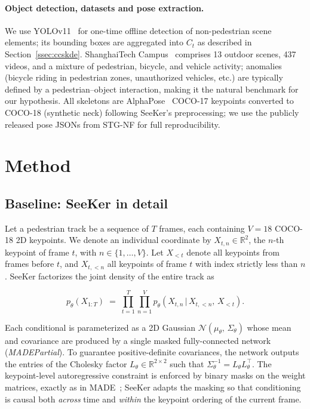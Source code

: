 \documentclass{article}
\begin{document}
\paragraph{Object detection, datasets and pose extraction.}
We use YOLOv11~\citep{ultralytics2024yolov11} for one-time offline detection
of non-pedestrian scene elements; its bounding boxes are aggregated into
$C_t$ as described in Section~\ref{ssec:ccskde}. ShanghaiTech
Campus~\citep{liu2018future} comprises 13 outdoor scenes, 437 videos, and a
mixture of pedestrian, bicycle, and vehicle activity; anomalies (bicycle
riding in pedestrian zones, unauthorized vehicles, etc.) are typically
defined by a pedestrian--object interaction, making it the natural benchmark
for our hypothesis. All skeletons are AlphaPose~\citep{fang2017rmpe}
COCO-17 keypoints converted to COCO-18 (synthetic neck) following SeeKer's
preprocessing; we use the publicly released pose JSONs from STG-NF for full
reproducibility.

\section{Method}
\label{sec:method}

\subsection{Baseline: SeeKer in detail}
\label{ssec:baseline}

Let a pedestrian track be a sequence of $T$ frames, each containing $V=18$
COCO-18 2D keypoints. We denote an individual coordinate by
$X_{t,n} \in \mathbb{R}^{2}$, the $n$-th keypoint of frame $t$, with
$n \in \{1,\dots,V\}$. Let $X_{<t}$ denote all keypoints from frames before
$t$, and $X_{t,<n}$ all keypoints of frame $t$ with index strictly less than
$n$. SeeKer factorizes the joint density of the entire track as

\begin{equation}
\label{eq:seeker_factor}
p_{\theta}\!\left(X_{1:T}\right) \;=\;
\prod_{t=1}^{T} \prod_{n=1}^{V}
p_{\theta}\!\left(X_{t,n}\,\big|\, X_{t,<n},\, X_{<t}\right).
\end{equation}

Each conditional is parameterized as a 2D Gaussian
$\mathcal{N}\!\left(\mu_{\theta},\, \Sigma_{\theta}\right)$ whose mean and
covariance are produced by a single masked fully-connected network
(\emph{MADEPartial}). To guarantee positive-definite covariances, the
network outputs the entries of the Cholesky factor
$L_{\theta} \in \mathbb{R}^{2 \times 2}$ such that
$\Sigma_{\theta}^{-1} = L_{\theta} L_{\theta}^{\!\top}$. The
keypoint-level autoregressive constraint is enforced by binary masks on the
weight matrices, exactly as in MADE~\citep{germain2015made}; SeeKer adapts
the masking so that conditioning is causal both \emph{across} time and
\emph{within} the keypoint ordering of the current frame.
\end{document}
